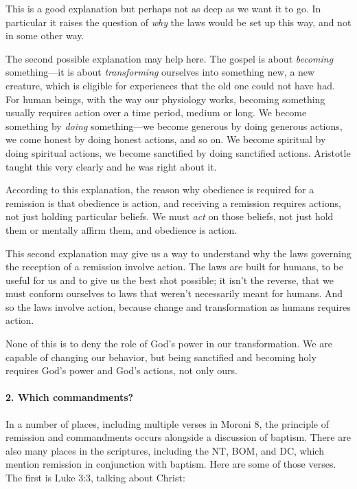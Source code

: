 				This is a good explanation but perhaps not as deep as we want it to go. In particular it raises the question of \textit{why} the laws would be set up this way, and not in some other way.
				
				The second possible explanation may help here. The gospel is about \textit{becoming} something---it is about \textit{transforming} ourselves into something new, a new creature, which is eligible for experiences that the old one could not have had. For human beings, with the way our physiology works, becoming something usually requires action over a time period, medium or long. We become something by \textit{doing} something---we become generous by doing generous actions, we come honest by doing honest actions, and so on. We become spiritual by doing spiritual actions, we become sanctified by doing sanctified actions. Aristotle taught this very clearly and he was right about it.
				
				According to this explanation, the reason why obedience is required for a remission is that obedience is action, and receiving a remission requires actions, not just holding particular beliefs. We must \textit{act} on those beliefs, not just hold them or mentally affirm them, and obedience is action.
				
				This second explanation may give us a way to understand why the laws governing the reception of a remission involve action. The laws are built for humans, to be useful for us and to give us the best shot possible; it isn't the reverse, that we must conform ourselves to laws that weren't necessarily meant for humans. And so the laws involve action, because change and transformation as humans requires action.
				
				None of this is to deny the role of God's power in our transformation. We are capable of changing our behavior, but being sanctified and becoming holy requires God's power and God's actions, not only ours.
				
			\paragraph{2. Which commandments?}
				\label{REMISSION-commandments-which}
			
				In a number of places, including multiple verses in Moroni 8, the principle of remission and commandments occurs alongside a discussion of baptism. There are also many places in the scriptures, including the NT, BOM, and DC, which mention remission in conjunction with baptism. Here are some of those verses. The first is Luke 3:3, talking about Christ:
				
